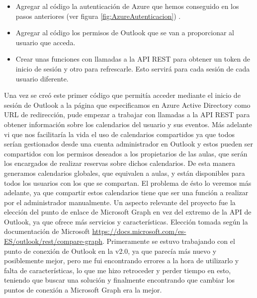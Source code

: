 \begin{itemize}
    \item Agregar al código la autenticación de Azure que hemos conseguido en los pasos anteriores (ver figura \ref{fig:AzureAutenticacion}) .
    \item Agregar al código los permisos de Outlook que se van a proporcionar al usuario que acceda.
    \item Crear unas funciones con llamadas a la API REST para obtener un token de inicio de sesión y otro para refrescarle. Esto servirá para cada sesión de cada usuario diferente.
\end{itemize}
Una vez se creó este primer código que permitía acceder mediante el inicio de sesión de Outlook a la página que especificamos en Azure Active Directory como URL de redirección, pude empezar a trabajar con llamadas a la API REST para obtener información sobre los calendarios del usuario y sus eventos.\newline
Más adelante vi que nos facilitaría la vida el uso de calendarios compartidos ya que todos serían gestionados desde una cuenta administrador en Outlook y estos pueden ser compartidos con los permisos deseados a los propietarios de las aulas, que serán los encargados de realizar reservas sobre dichos calendarios. De esta manera generamos calendarios globales, que equivalen a aulas, y están disponibles para todos los usuarios con los que se compartan. El problema de ésto lo veremos más adelante, ya que compartir estos calendarios tiene que ser una función a realizar por el administrador manualmente.\newline
Un aspecto relevante del proyecto fue la elección del punto de enlace de Microsoft Graph en vez del extremo de la API de Outlook, ya que ofrece más servicios y características. Elección tomada según la documentación de Microsoft \url{https://docs.microsoft.com/es-ES/outlook/rest/compare-graph}\cite{microsoftGraphCompare}. Primeramente se estuvo trabajando con el punto de conexión de Outlook en la v2.0, ya que parecía más nuevo y posiblemente mejor, pero me fui encontrando errores a la hora de utilizarlo y falta de características, lo que me hizo retroceder y perder tiempo en esto, teniendo que buscar una solución y finalmente encontrando que cambiar los puntos de conexión a Microsoft Graph era la mejor.\newline

